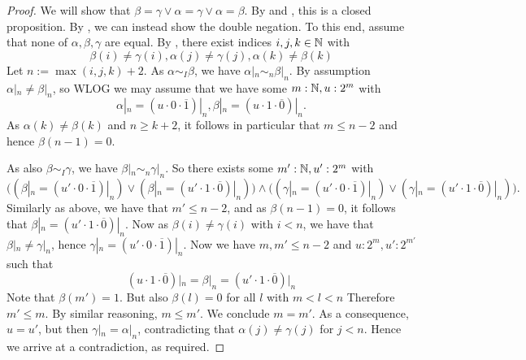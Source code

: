 \begin{proof}
  We will show that $\beta = \gamma \vee \alpha = \gamma \vee \alpha = \beta$. 
  By  and , this is a closed proposition. 
  By , we can instead show the double negation. 
  To this end, assume that none of $\alpha,\beta,\gamma$ are equal. 
  By , there exist indices $i,j,k\in \mathbb{N}$ with 
  \begin{equation}
    \beta(i) \neq \gamma(i), \alpha(j) \neq \gamma(j), \alpha(k) \neq \beta(k)
  \end{equation}
  Let $n:=\max(i,j,k) + 2$. 
  As $\alpha\sim_I \beta$, we have $\alpha|_n\sim_n\beta|_n$. 
  By assumption $\alpha|_n \neq \beta|_n$, so WLOG we may assume that 
  we have some $m: \mathbb{N}, u:2^m$ with 
  \begin{equation}
    \alpha|_n = (u\cdot 0 \cdot \overline 1) |_n , \beta|_n = (u \cdot 1 \cdot \overline 0)|_n.
  \end{equation}
  As $\alpha(k) \neq \beta(k) $ and $n\geq k+2$, 
  it follows in particular that $m\leq n-2$ and hence 
  $\beta(n-1) = 0$.%

  As also $\beta\sim_I \gamma$, we have $\beta|_n \sim_n \gamma|_n$.
  So there exists some $m':\mathbb{N}, u':2^m$ with 
 \begin{equation} %
   \big(
     (\beta|_{n} = (u'\cdot 0\cdot \overline 1)|_n) \vee (\beta|_{n} = (u' \cdot 1 \cdot \overline 0) |_n)
   \big)
    \wedge 
   \big(
     (\gamma|_{n} = (u'\cdot 0\cdot \overline 1)|_n) \vee (\gamma|_{n} = (u' \cdot 1 \cdot \overline 0) |_n)
   \big).
  \end{equation} 
  Similarly as above, we have that $m'\leq n-2$, and as $\beta(n-1) = 0$, it follows that 
  $\beta|_{n} = (u' \cdot 1 \cdot \overline 0) |_n$. 
  Now as $\beta(i)\neq \gamma(i)$ with $i<n$, we have that $\beta|_n \neq \gamma|_n$, hence 
  $\gamma|_{n} = (u'\cdot 0\cdot \overline 1)|_n$. 
  Now we have $m,m'\leq n-2$ and $u:2^m, u':2^{m'}$ such that 
  \begin{equation}
    (u\cdot 1 \cdot \overline 0)|_n = \beta|_n = (u'\cdot 1 \cdot \overline 0)|_n
  \end{equation}
  Note that $\beta(m') = 1$. 
  But also $\beta(l) = 0$ for all $l$ with $m<l<n$
  Therefore $m'\leq m$. 
  By similar reasoning, $m\leq m'$. We conclude $m=m'$. 
  As a consequence, $u = u'$, but then 
  $\gamma|_n = \alpha|_n$, contradicting that $\alpha(j)\neq \gamma(j) $ for $j<n$. 
  Hence we arrive at a contradiction, as required. 
\end{proof}


